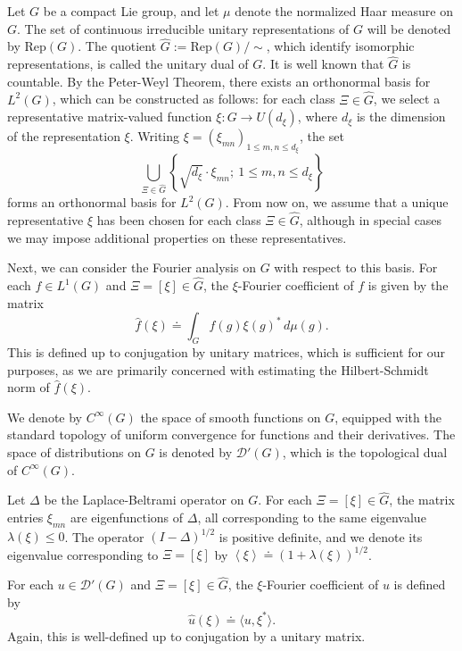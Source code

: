 \documentclass[sn-mathphys-num]{sn-jnl}%
\numberwithin{equation}{section}
\theoremstyle{thmstyleone}
\theoremstyle{thmstyletwo}
\theoremstyle{thmstylethree}
\def\jp#1{{\left\langle{#1}\right\rangle}}
\begin{document}
Let $G$ be a compact Lie group, and let $\mu$ denote the normalized Haar measure on $G$. The set of continuous irreducible unitary representations of $G$ will be denoted by $\textrm{Rep}(G)$. The quotient $\widehat{G}:=\textrm{Rep}(G)/\sim$, which identify isomorphic representations, is called the unitary dual of $G$. It is well known that $\widehat{G}$ is countable. By the Peter-Weyl Theorem, there exists an orthonormal basis for $L^2(G)$, which can be constructed as follows: for each class $\Xi \in \widehat{G}$, we select a representative matrix-valued function $\xi: G \to U(d_\xi)$, where $d_\xi$ is the dimension of the representation $\xi$. Writing $\xi = (\xi_{mn})_{1 \leq m,n \leq d_\xi}$, the set
$$
\bigcup_{\Xi \in \widehat{G}} \left\{ \sqrt{d_\xi} \cdot \xi_{mn}; \ 1 \leq m,n \leq d_\xi \right\}
$$
forms an orthonormal basis for $L^2(G)$. From now on, we assume that a unique representative $\xi$ has been chosen for each class $\Xi \in \widehat{G}$, although in special cases we may impose additional properties on these representatives.

Next, we can consider the Fourier analysis on $G$ with respect to this basis. For each $f \in L^1(G)$ and $\Xi = [\xi] \in \widehat{G}$, the $\xi$-Fourier coefficient of $f$ is given by the matrix
$$
\widehat{f}(\xi) \doteq \int_G f(g) \xi(g)^\ast \, d\mu(g).
$$
This is defined up to conjugation by unitary matrices, which is sufficient for our purposes, as we are primarily concerned with estimating the Hilbert-Schmidt norm of $\widehat{f}(\xi)$. 

We denote by $C^\infty(G)$ the space of smooth functions on $G$, equipped with the standard topology of uniform convergence for functions and their derivatives. The space of distributions on $G$ is denoted by $\mathcal{D}'(G)$, which is the topological dual of $C^\infty(G)$.

Let $\Delta$ be the Laplace-Beltrami operator on $G$. For each $\Xi = [\xi] \in \widehat{G}$, the matrix entries $\xi_{mn}$ are eigenfunctions of $\Delta$, all corresponding to the same eigenvalue $\lambda(\xi) \leq 0$. The operator $(I - \Delta)^{1/2}$ is positive definite, and we denote its eigenvalue corresponding to $\Xi = [\xi]$ by $\jp{\xi} \doteq (1 + \lambda(\xi))^{1/2}$.

For each $u \in \mathcal{D}'(G)$ and $\Xi = [\xi] \in \widehat{G}$, the $\xi$-Fourier coefficient of $u$ is defined by
$$
\widehat{u}(\xi) \doteq \langle u, \xi^\ast \rangle.
$$
Again, this is well-defined up to conjugation by a unitary matrix.
\end{document}
